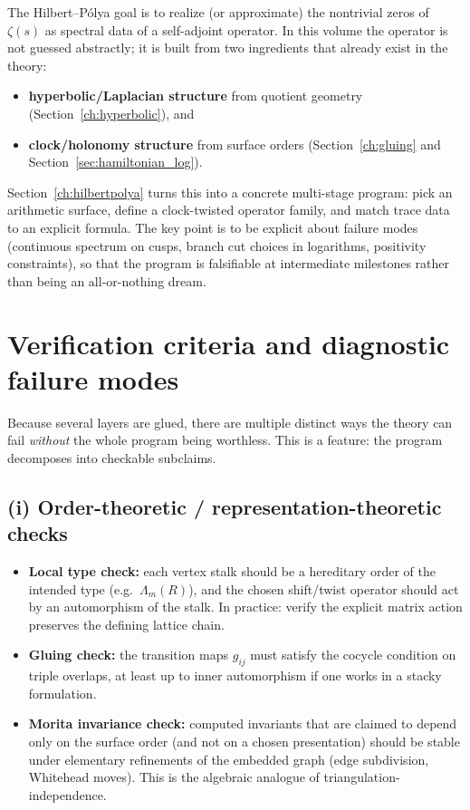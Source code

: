 \documentclass[11pt,oneside]{amsbook}
\numberwithin{equation}{section}
\theoremstyle{plain}
\theoremstyle{definition}
\theoremstyle{remark}
\begin{document}
The Hilbert--Pólya goal is to realize (or approximate) the nontrivial zeros of $\zeta(s)$ as spectral data of a self-adjoint operator.
In this volume the operator is not guessed abstractly; it is built from two ingredients that already exist in the theory:
\begin{itemize}
\item \textbf{hyperbolic/Laplacian structure} from quotient geometry (Section~\ref{ch:hyperbolic}), and
\item \textbf{clock/holonomy structure} from surface orders (Section~\ref{ch:gluing} and Section~\ref{sec:hamiltonian_log}).
\end{itemize}

Section~\ref{ch:hilbertpolya} turns this into a concrete multi-stage program:
pick an arithmetic surface, define a clock-twisted operator family, and match trace data to an explicit formula.
The key point is to be explicit about failure modes (continuous spectrum on cusps, branch cut choices in logarithms, positivity constraints),
so that the program is falsifiable at intermediate milestones rather than being an all-or-nothing dream.
\section*{Verification criteria and diagnostic failure modes}

Because several layers are glued, there are multiple distinct ways the theory can fail \emph{without} the whole program being worthless.
This is a feature: the program decomposes into checkable subclaims.

\subsection*{(i) Order-theoretic / representation-theoretic checks}
\begin{itemize}
\item \textbf{Local type check:} each vertex stalk should be a hereditary order of the intended type (e.g.\ $\Lambda_m(R)$), and the chosen shift/twist operator should act by an automorphism of the stalk. In practice: verify the explicit matrix action preserves the defining lattice chain.
\item \textbf{Gluing check:} the transition maps $g_{ij}$ must satisfy the cocycle condition on triple overlaps, at least up to inner automorphism if one works in a stacky formulation.
\item \textbf{Morita invariance check:} computed invariants that are claimed to depend only on the surface order (and not on a chosen presentation) should be stable under elementary refinements of the embedded graph (edge subdivision, Whitehead moves). This is the algebraic analogue of triangulation-independence.
\end{itemize}
\end{document}
